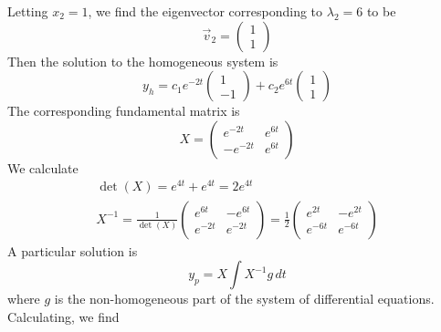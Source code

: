 \documentclass[11pt, titlepage]{article}
\begin{document}
\begin{enumerate}
\begin{solution}
                Letting $x_2 = 1$, we find the eigenvector corresponding to
                $\lambda_2 = 6$ to be
                \[
                    \vec{v}_2 = 
                    \begin{pmatrix}
                        1 \\
                        1
                    \end{pmatrix}
                \] 
                Then the solution to the homogeneous system is
                \[
                y_h = c_1 e^{-2t}
                \begin{pmatrix}
                    1 \\
                    -1
                \end{pmatrix} + c_2 e^{6t}
                \begin{pmatrix}
                    1 \\
                    1
                \end{pmatrix}
                \] 
                The corresponding fundamental matrix is
                \[
                X = 
                \begin{pmatrix}
                    e^{-2t} & e^{6t} \\
                    -e^{-2t} & e^{6t}
                \end{pmatrix}
                \] 
                We calculate
                \begin{gather*}
                    \det(X) = e^{4t} + e^{4t} = 2e^{4t} \\
                    X^{-1} = \frac{1}{\det(X)}
                    \begin{pmatrix}
                        e^{6t} & -e^{6t} \\
                        e^{-2t} & e^{-2t}
                    \end{pmatrix} = \frac{1}{2}
                    \begin{pmatrix}
                        e^{2t} & -e^{2t} \\
                        e^{-6t} & e^{-6t} 
                    \end{pmatrix}
                \end{gather*}
                A particular solution is
                \[
                y_p = X \int X^{-1} g \, dt
                \] 
                where $g$ is the non-homogeneous part of the system of
                differential equations. Calculating, we find
                \begin{align*}

\end{align*}
\end{solution}
\end{enumerate}
\end{document}
